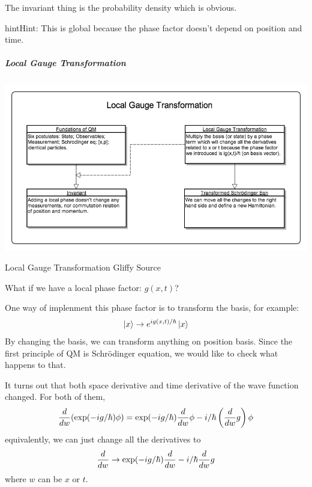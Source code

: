 \documentclass[letterpaper,10pt,english]{sphinxmanual}
\newcommand{\ket}[1]{\left| #1\right\rangle}
\begin{document}
The invariant thing is the probability density which is obvious.

\begin{notice}{hint}{Hint:}
This is global because the phase factor doesn't depend on position and time.
\end{notice}


\subparagraph{Local Gauge Transformation}
\label{Quantum/symmetries:local-gauge-transformation}
\includegraphics{LocalGaugeTransformation.png}

Local Gauge Transformation Gliffy Source

What if we have a local phase factor: \(g(x,t)\)?

One way of implenment this phase factor is to transform the basis, for example:
\begin{gather}
\begin{split}\ket{x} \rightarrow e^{i g(x,t)/\hbar} \ket{x}\end{split}\notag
\end{gather}
By changing the basis, we can transform anything on position basis. Since the first principle of QM is Schrödinger equation, we would like to check what happens to that.

It turns out that both space derivative and time derivative of the wave function changed. For both of them,
\begin{gather}
\begin{split}\frac{d}{dw} (\exp(-ig/\hbar)\phi ) = \exp(-ig/\hbar)\frac{d}{dw} \phi - i/\hbar \left(\frac{d}{dw} g\right) \phi\end{split}\notag
\end{gather}
equivalently, we can just change all the derivatives to
\begin{gather}
\begin{split}\frac{d}{dw} \rightarrow  \exp(-ig/\hbar)\frac{d}{dw} - i/\hbar \frac{d}{dw} g\end{split}\notag
\end{gather}
where \(w\) can be \(x\) or \(t\).
\end{document}
